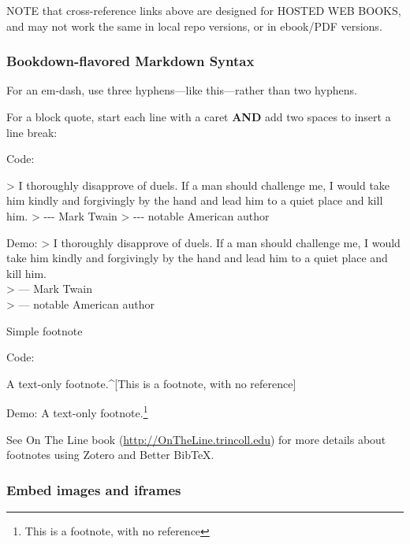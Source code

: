 \documentclass[
  english,
]{book}
\newenvironment{Shaded}{\begin{snugshade}}{\end{snugshade}}
\newcommand{\DataTypeTok}[1]{\textcolor[rgb]{0.13,0.29,0.53}{#1}}
\newcommand{\NormalTok}[1]{#1}
\begin{document}
NOTE that cross-reference links above are designed for HOSTED WEB BOOKS, and may not work the same in local repo versions, or in ebook/PDF versions.

\hypertarget{bookdown-flavored-markdown-syntax}{%
\subsubsection*{Bookdown-flavored Markdown Syntax}\label{bookdown-flavored-markdown-syntax}}

For an em-dash, use three hyphens---like this---rather than two hyphens.

For a block quote, start each line with a caret \textbf{AND} add two spaces to insert a line break:

Code:

\begin{Shaded}
\begin{Highlighting}[]
\NormalTok{>}\DataTypeTok{ I thoroughly disapprove of duels. If a man should challenge me, I would take him kindly and forgivingly by the hand and lead him to a quiet place and kill him.    }
\DataTypeTok{> {-}{-}{-} Mark Twain}  
\DataTypeTok{> {-}{-}{-} notable American author}
\end{Highlighting}
\end{Shaded}

Demo:
\textgreater{} I thoroughly disapprove of duels. If a man should challenge me, I would take him kindly and forgivingly by the hand and lead him to a quiet place and kill him.\\
\textgreater{} --- Mark Twain\\
\textgreater{} --- notable American author

Simple footnote

Code:

\begin{Shaded}
\begin{Highlighting}[]
\NormalTok{A text{-}only footnote.\^{}[This is a footnote, with no reference]}
\end{Highlighting}
\end{Shaded}

Demo:
A text-only footnote.\footnote{This is a footnote, with no reference}

See On The Line book (\url{http://OnTheLine.trincoll.edu}) for more details about footnotes using Zotero and Better BibTeX.

\hypertarget{embed-images-and-iframes}{%
\subsubsection*{Embed images and iframes}\label{embed-images-and-iframes}}
\end{document}
